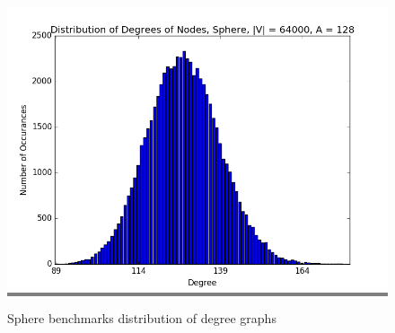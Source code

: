 \documentclass{article}
\begin{document}
\begin{figure}
\begin{minipage}{0.45\textwidth}
    \colorbox{gray}{\includegraphics[width=\linewidth]{./graphs/hist_deg_sphere_2.png}}
    \end{minipage}

    \caption{Sphere benchmarks distribution of degree graphs}
    \label{spheredeghists}
\end{figure}
\end{document}
